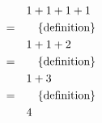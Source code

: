 \documentclass{article}
\begin{document}
\begin{EqReasoning}
  \begin{align*}
    & \quad 1 + 1 + 1 + 1 \\
    =& \qquad \text{\{definition\}} \\
    & \quad 1 + 1 + 2 \\
    =& \qquad \text{\{definition\}} \\
    & \quad 1 + 3 \\
    =& \qquad \text{\{definition\}} \\
    & \quad 4
  \end{align*}
\end{EqReasoning}
\end{document}
